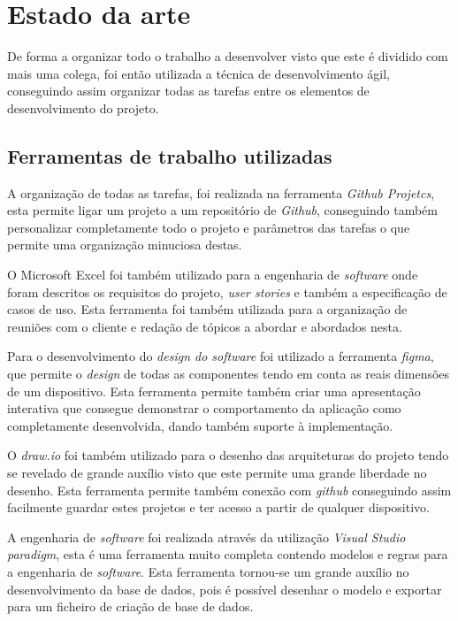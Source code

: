 
\chapter{Estado da arte}
De forma a organizar todo o trabalho a desenvolver visto que este é dividido com mais uma colega, 
foi então utilizada a técnica de desenvolvimento ágil, conseguindo assim organizar todas as tarefas 
entre os elementos de desenvolvimento do projeto.

\section{Ferramentas de trabalho utilizadas}

A organização de todas as tarefas, foi realizada na ferramenta \textit{Github Projetcs}, esta 
permite ligar um projeto a um repositório de \textit{Github}, conseguindo também personalizar completamente todo 
o projeto e parâmetros das tarefas o que permite uma organização minuciosa destas.

O Microsoft Excel foi também utilizado para a engenharia de \textit{software} onde foram descritos os requisitos 
do projeto, \textit{user stories} e também a especificação de casos de uso. Esta ferramenta foi também utilizada 
para a organização de reuniões com o cliente e redação de tópicos a abordar e abordados nesta.

Para o desenvolvimento do \textit{design do software} foi utilizado a ferramenta \textit{figma}, que permite o \textit{design} de 
todas as componentes tendo em conta as reais dimensões de um dispositivo. Esta ferramenta 
permite também criar uma apresentação interativa que consegue demonstrar o comportamento da aplicação 
como completamente desenvolvida, dando também suporte à implementação.

O \textit{draw.io} foi também utilizado para o desenho das arquiteturas do projeto tendo se revelado de grande auxílio 
visto que este permite uma grande liberdade no desenho. Esta ferramenta permite também 
conexão com \textit{github} conseguindo assim facilmente guardar estes projetos e ter acesso a partir de qualquer 
dispositivo.

A engenharia de \textit{software} foi realizada através da utilização \textit{Visual Studio paradigm}, esta é uma ferramenta muito 
completa contendo modelos e regras para a engenharia de \textit{software}. Esta ferramenta tornou-se um grande 
auxílio no desenvolvimento da base de dados, pois é possível desenhar o modelo e exportar para um ficheiro 
de criação de base de dados.

